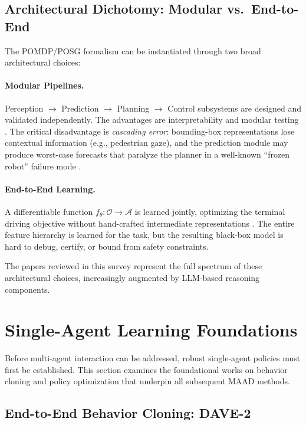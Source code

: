 \documentclass[12pt, a4paper]{article}
\begin{document}
\subsection{Architectural Dichotomy: Modular vs.\ End-to-End}
The POMDP/POSG formalism can be instantiated through two broad architectural
choices:

\paragraph{Modular Pipelines.}
Perception $\to$ Prediction $\to$ Planning $\to$ Control subsystems are designed
and validated independently. The advantages are interpretability and modular
testing \citep{caesar2021nuplan}. The critical disadvantage is \emph{cascading
error}: bounding-box representations lose contextual information (e.g., pedestrian
gaze), and the prediction module may produce worst-case forecasts that paralyze
the planner in a well-known ``frozen robot'' failure mode \citep{song2020pip}.

\paragraph{End-to-End Learning.}
A differentiable function $f_\theta: \mathcal{O} \to \mathcal{A}$ is learned
jointly, optimizing the terminal driving objective without hand-crafted intermediate
representations \citep{bojarski2016end}. The entire feature hierarchy is learned
for the task, but the resulting black-box model is hard to debug, certify, or
bound from safety constraints.

The papers reviewed in this survey represent the full spectrum of these
architectural choices, increasingly augmented by LLM-based reasoning components.

\section{Single-Agent Learning Foundations}
\label{sec:single}

Before multi-agent interaction can be addressed, robust single-agent policies must
first be established. This section examines the foundational works on behavior
cloning and policy optimization that underpin all subsequent MAAD methods.

\subsection{End-to-End Behavior Cloning: DAVE-2}
\label{sec:dave}
\end{document}

